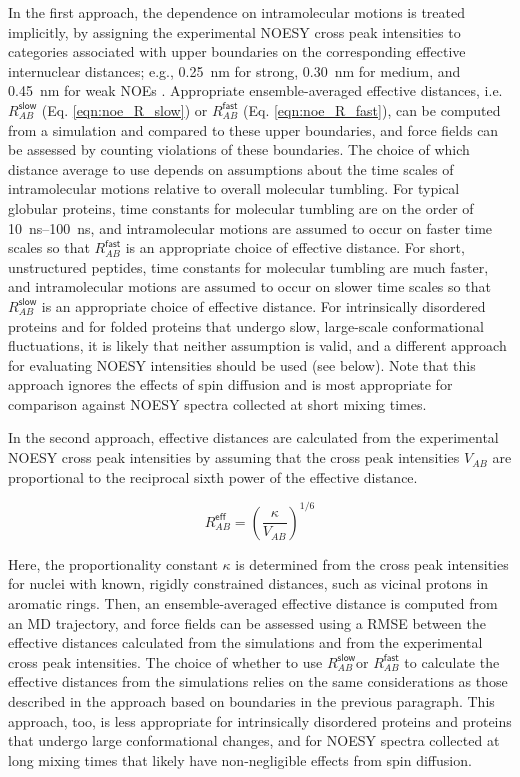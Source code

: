 \documentclass[9pt,review]{livecoms}
\begin{document}
In the first approach, the dependence on intramolecular motions is treated implicitly, by assigning the experimental NOESY cross peak intensities to categories associated with upper boundaries on the corresponding effective internuclear distances; e.g., \qty{0.25}{\nano\meter} for strong, \qty{0.30}{\nano\meter} for medium, and \qty{0.45}{\nano\meter} for weak NOEs \cite{smith_structure_1993}.
Appropriate ensemble-averaged effective distances, i.e. $R_{AB}^{\mathsf{slow}}$ (Eq. \ref{eqn:noe_R_slow}) or $R_{AB}^{\mathsf{fast}}$ (Eq. \ref{eqn:noe_R_fast}), can be computed from a simulation and compared to these upper boundaries, and force fields can be assessed by counting violations of these boundaries.
The choice of which distance average to use depends on assumptions about the time scales of intramolecular motions relative to overall molecular tumbling.
For typical globular proteins, time constants for molecular tumbling are on the order of \qtyrange{10}{100}{\nano\second}, and intramolecular motions are assumed to occur on faster time scales so that $R_{AB}^{\mathsf{fast}}$ is an appropriate choice of effective distance.
For short, unstructured peptides, time constants for molecular tumbling are much faster, and intramolecular motions are assumed to occur on slower time scales so that $R_{AB}^{\mathsf{slow}}$ is an appropriate choice of effective distance.
For intrinsically disordered proteins and for folded proteins that undergo slow, large-scale conformational fluctuations, it is likely that neither assumption is valid, and a different approach for evaluating NOESY intensities should be used (see below).
Note that this approach ignores the effects of spin diffusion and is most appropriate for comparison against NOESY spectra collected at short mixing times.

In the second approach, effective distances are calculated from the experimental NOESY cross peak intensities by assuming that the cross peak intensities $V_{AB}$ are proportional to the reciprocal sixth power of the effective distance.

\begin{equation}
\label{eqn:noesy_sixth_power}
R_{AB}^{\mathsf{eff}} = \left( \frac {\kappa} {V_{AB}} \right)^{1/6}
\end{equation}

Here, the proportionality constant $\kappa$ is determined from the cross peak intensities for nuclei with known, rigidly constrained distances, such as vicinal protons in aromatic rings.
Then, an ensemble-averaged effective distance is computed from an MD trajectory, and force fields can be assessed using a RMSE between the effective distances calculated from the simulations and from the experimental cross peak intensities.
The choice of whether to use $R_{AB}^{\mathsf{slow}}$or $R_{AB}^{\mathsf{fast}}$ to calculate the effective distances from the simulations relies on the same considerations as those described in the approach based on boundaries in the previous paragraph.
This approach, too, is less appropriate for intrinsically disordered proteins and proteins that undergo large conformational changes, and for NOESY spectra collected at long mixing times that likely have non-negligible effects from spin diffusion.
\end{document}
